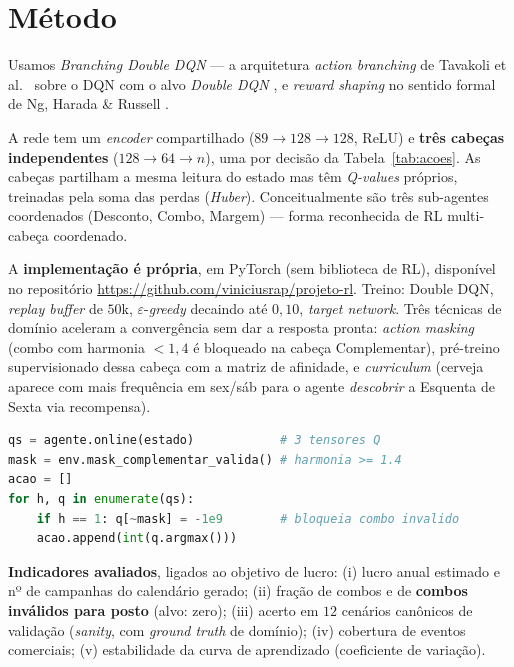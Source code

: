 \documentclass[9pt,a4paper,twoside]{tau}
\begin{document}
\section{Método}

\begin{info}[frametitle=Algoritmo]
Usamos \textit{Branching Double DQN} --- a arquitetura \textit{action
branching} de Tavakoli et al.\ \cite{tavakoli2018} sobre o DQN
\cite{mnih2013} com o alvo \textit{Double DQN} \cite{hasselt2016}, e
\textit{reward shaping} no sentido formal de Ng, Harada \& Russell
\cite{ng1999}.
\end{info}

A rede tem um \textit{encoder} compartilhado (\(89\to128\to128\), ReLU) e
\textbf{três cabeças independentes} (\(128\to64\to n\)), uma por decisão da
Tabela~\ref{tab:acoes}. As cabeças partilham a mesma leitura do estado mas
têm \textit{Q-values} próprios, treinadas pela soma das perdas
(\textit{Huber}). Conceitualmente são três sub-agentes coordenados
(Desconto, Combo, Margem) --- forma reconhecida de RL multi-cabeça
coordenado.

A \textbf{implementação é própria}, em PyTorch (sem biblioteca de RL),
disponível no repositório
\url{https://github.com/viniciusrap/projeto-rl}. Treino: Double DQN,
\textit{replay buffer} de \(50\)k, \(\varepsilon\)-\textit{greedy}
decaindo até \(0{,}10\), \textit{target network}. Três técnicas de domínio
aceleram a convergência sem dar a resposta pronta: \textit{action masking}
(combo com harmonia \(<1{,}4\) é bloqueado na cabeça Complementar),
pré-treino supervisionado dessa cabeça com a matriz de afinidade, e
\textit{curriculum} (cerveja aparece com mais frequência em sex/sáb para o
agente \textit{descobrir} a Esquenta de Sexta via recompensa).

\begin{lstlisting}[caption=Decodificação da ação (rollout greedy com máscara),language=python]
qs = agente.online(estado)            # 3 tensores Q
mask = env.mask_complementar_valida() # harmonia >= 1.4
acao = []
for h, q in enumerate(qs):
    if h == 1: q[~mask] = -1e9        # bloqueia combo invalido
    acao.append(int(q.argmax()))
\end{lstlisting}

\textbf{Indicadores avaliados}, ligados ao objetivo de lucro: (i) lucro
anual estimado e nº de campanhas do calendário gerado; (ii) fração de
combos e de \textbf{combos inválidos para posto} (alvo: zero); (iii)
acerto em \(12\) cenários canônicos de validação (\textit{sanity}, com
\textit{ground truth} de domínio); (iv) cobertura de eventos comerciais;
(v) estabilidade da curva de aprendizado (coeficiente de variação).
\end{document}
